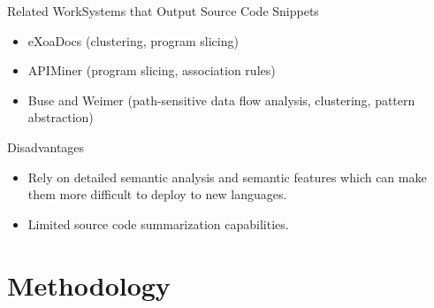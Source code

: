 \documentclass[11pt]{beamer}
\begin{document}
\begin{frame}{Related Work}{Systems that Output Source Code Snippets}
	\begin{itemize}
		\item {
			eXoaDocs (clustering, program slicing)
		}
		\item {
			APIMiner (program slicing, association rules)
		}
		\item{
		      Buse and Weimer (path-sensitive data flow analysis, clustering, pattern abstraction)
		}
	\end{itemize}
	\begin{alertblock}{Disadvantages}
		\begin{itemize}
			\item{
			      Rely on detailed semantic analysis and semantic features which can make them more difficult to deploy to new languages.
			}
			\item {Limited source code summarization capabilities.
			}
		\end{itemize}
	\end{alertblock}
\end{frame}

\section{Methodology}
\end{document}
